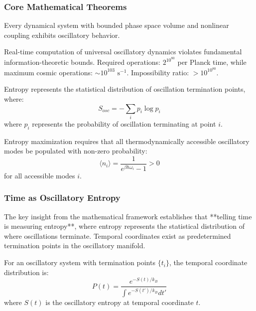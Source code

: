\documentclass[11pt,a4paper]{article}
\begin{document}
\subsubsection{Core Mathematical Theorems}

\begin{theorem}
Every dynamical system with bounded phase space volume and nonlinear coupling exhibits oscillatory behavior.
\end{theorem}

\begin{theorem}
Real-time computation of universal oscillatory dynamics violates fundamental information-theoretic bounds. Required operations: $2^{10^{80}}$ per Planck time, while maximum cosmic operations: $\sim 10^{103} \text{ s}^{-1}$. Impossibility ratio: $>10^{10^{80}}$.
\end{theorem}

\begin{theorem}
Entropy represents the statistical distribution of oscillation termination points, where:
\begin{equation}
S_{osc} = -\sum_i p_i \log p_i
\end{equation}
where $p_i$ represents the probability of oscillation terminating at point $i$.
\end{theorem}

\begin{theorem}
Entropy maximization requires that all thermodynamically accessible oscillatory modes be populated with non-zero probability:
\begin{equation}
\langle n_i \rangle = \frac{1}{e^{\beta \hbar \omega_i} - 1} > 0
\end{equation}
for all accessible modes $i$.
\end{theorem}

\subsubsection{Time as Oscillatory Entropy}

The key insight from the mathematical framework establishes that **telling time is measuring entropy**, where entropy represents the statistical distribution of where oscillations terminate. Temporal coordinates exist as predetermined termination points in the oscillatory manifold.

\begin{definition}
For an oscillatory system with termination points $\{t_i\}$, the temporal coordinate distribution is:
\begin{equation}
P(t) = \frac{e^{-S(t)/k_B}}{\int e^{-S(t')/k_B} dt'}
\end{equation}
where $S(t)$ is the oscillatory entropy at temporal coordinate $t$.
\end{definition}
\end{document}
